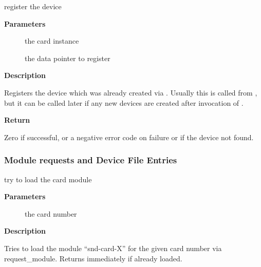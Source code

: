 \documentclass[a4paper,8pt,english]{sphinxmanual}
\begin{document}
\begin{fulllineitems}
\label{sound/kernel-api/alsa-driver-api:c.snd_device_register}
register the device

\end{fulllineitems}


\textbf{Parameters}
\begin{description}
\item[{}] \leavevmode
the card instance

\item[{}] \leavevmode
the data pointer to register

\end{description}

\textbf{Description}

Registers the device which was already created via
.  Usually this is called from ,
but it can be called later if any new devices are created after
invocation of .

\textbf{Return}

Zero if successful, or a negative error code on failure or if the
device not found.


\subsubsection{Module requests and Device File Entries}
\label{sound/kernel-api/alsa-driver-api:module-requests-and-device-file-entries}

\begin{fulllineitems}
\label{sound/kernel-api/alsa-driver-api:c.snd_request_card}
try to load the card module

\end{fulllineitems}


\textbf{Parameters}
\begin{description}
\item[{}] \leavevmode
the card number

\end{description}

\textbf{Description}

Tries to load the module ``snd-card-X'' for the given card number
via request\_module.  Returns immediately if already loaded.
\end{document}
